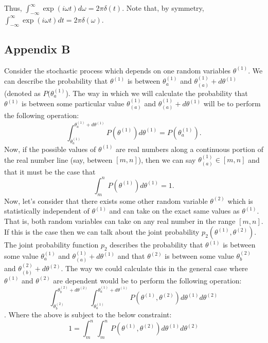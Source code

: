 \begin{appendices}
   Thus, $ \int_{-\infty}^{\infty}\exp( i \omega t) d\omega = 2 \pi
   \delta(t)$. Note that, by symmetry,
   $ \int_{-\infty}^{\infty}\exp(i \omega t) dt = 2 \pi \delta(\omega)$.

   \clearpage
   \subsection{Appendix B}
   Consider the stochastic process which depends on one random variables $
   \theta^{(1)} $. We can describe the probability that $ \theta^{(1)} $ is
   between $ \theta_{a}^{(1)} $ and $ \theta_{(a)}^{(1)} + d\theta^{(1)} $
   (denoted as $ P(\theta^{(1)}_{a} $). The
   way in which we will calculate the probability that $ \theta^{(1)} $ is
   between some particular value $ \theta_{(a)}^{(1)} $ and $ \theta_{(a)}^{(1)}
   + d\theta^{(1)}$ will be to perform the following operation:
   \[
      \int_{\theta_{a}^{(1)}}^{\theta_{a}^{(1)}+d\theta^{(1)}}P(\theta^{(1)})d\theta^{(1)}
      = P(\theta_{a}^{(1)}).
   \]
   Now, if the
   possible values of $ \theta^{(1)} $ are real numbers along a continuous
   portion of the real number line (say, between $ [m,n] $), then we can say $
   \theta_{(a)}^{(1)} \in [m,n] $ and that it must be the case that
   \[
      \int_{m}^{n}P(\theta^{(1)})d\theta^{(1)} = 1.
   \]
   Now, let's consider that there exists some other random variable $
   \theta^{(2)} $ which is statistically independent of $ \theta^{(1)} $ and can
   take on the exact same values as $ \theta^{(1)} $. That is, both random
   variables can take on any real number in the range $ [m,n] $. If this is the
   case then we can talk about the joint probability $
   p_{2}(\theta^{(1)},\theta^{(2)}) $. The joint probability function $ p_{2} $
   describes the probability that $ \theta^{(1)} $ is between some value $
   \theta_{a}^{(1)} $ and $ \theta_{(a)}^{(1)} + d\theta^{(1)} $ and that $
   \theta^{(2)} $ is between some value $ \theta_{b}^{(2)} $ and $
   \theta_{(b)}^{(2)} + d\theta^{(2)} $. The way we could calculate this in the
   general case where $ \theta^{(1)} $ and $ \theta^{(2)} $ are dependent would
   be to perform the following operation:
   \[
      \int_{\theta_{b}^{(2)}}^{\theta_{b}^{(2)}+d\theta^{(2)}}
      \int_{\theta_{a}^{(1)}}^{\theta_{a}^{(1)}+d\theta^{(1)}}
      P(\theta^{(1)},\theta^{(2)})d\theta^{(1)}d\theta^{(2)}
   \]
   . Where the above is subject to the below constraint:
   \[
      1 = \int_{m}^{n} \int_{m}^{n}
      P(\theta^{(1)},\theta^{(2)})
      d\theta^{(1)}d\theta^{(2)}
\]
\end{appendices}
